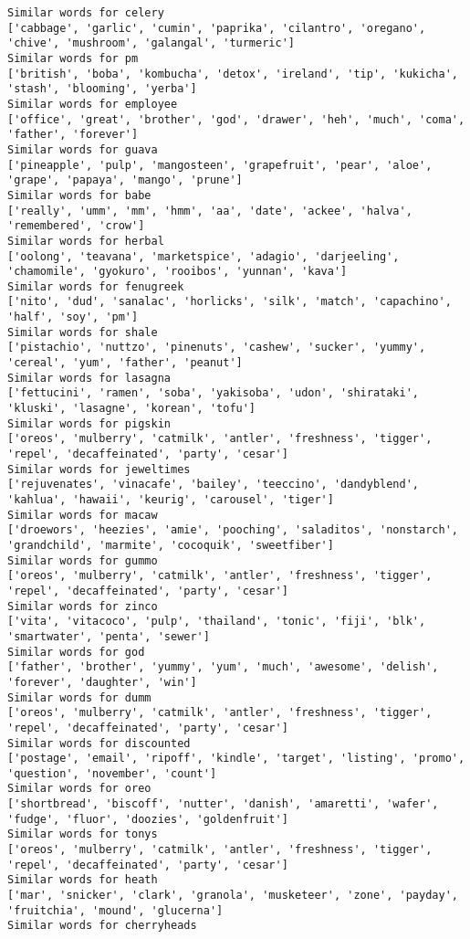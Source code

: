 \documentclass[11pt]{article}
\begin{document}
\begin{Verbatim}[commandchars=\\\{\}]
Similar words for celery
['cabbage', 'garlic', 'cumin', 'paprika', 'cilantro', 'oregano', 'chive', 'mushroom', 'galangal', 'turmeric']
Similar words for pm
['british', 'boba', 'kombucha', 'detox', 'ireland', 'tip', 'kukicha', 'stash', 'blooming', 'yerba']
Similar words for employee
['office', 'great', 'brother', 'god', 'drawer', 'heh', 'much', 'coma', 'father', 'forever']
Similar words for guava
['pineapple', 'pulp', 'mangosteen', 'grapefruit', 'pear', 'aloe', 'grape', 'papaya', 'mango', 'prune']
Similar words for babe
['really', 'umm', 'mm', 'hmm', 'aa', 'date', 'ackee', 'halva', 'remembered', 'crow']
Similar words for herbal
['oolong', 'teavana', 'marketspice', 'adagio', 'darjeeling', 'chamomile', 'gyokuro', 'rooibos', 'yunnan', 'kava']
Similar words for fenugreek
['nito', 'dud', 'sanalac', 'horlicks', 'silk', 'match', 'capachino', 'half', 'soy', 'pm']
Similar words for shale
['pistachio', 'nuttzo', 'pinenuts', 'cashew', 'sucker', 'yummy', 'cereal', 'yum', 'father', 'peanut']
Similar words for lasagna
['fettucini', 'ramen', 'soba', 'yakisoba', 'udon', 'shirataki', 'kluski', 'lasagne', 'korean', 'tofu']
Similar words for pigskin
['oreos', 'mulberry', 'catmilk', 'antler', 'freshness', 'tigger', 'repel', 'decaffeinated', 'party', 'cesar']
Similar words for jeweltimes
['rejuvenates', 'vinacafe', 'bailey', 'teeccino', 'dandyblend', 'kahlua', 'hawaii', 'keurig', 'carousel', 'tiger']
Similar words for macaw
['droewors', 'heezies', 'amie', 'pooching', 'saladitos', 'nonstarch', 'grandchild', 'marmite', 'cocoquik', 'sweetfiber']
Similar words for gummo
['oreos', 'mulberry', 'catmilk', 'antler', 'freshness', 'tigger', 'repel', 'decaffeinated', 'party', 'cesar']
Similar words for zinco
['vita', 'vitacoco', 'pulp', 'thailand', 'tonic', 'fiji', 'blk', 'smartwater', 'penta', 'sewer']
Similar words for god
['father', 'brother', 'yummy', 'yum', 'much', 'awesome', 'delish', 'forever', 'daughter', 'win']
Similar words for dumm
['oreos', 'mulberry', 'catmilk', 'antler', 'freshness', 'tigger', 'repel', 'decaffeinated', 'party', 'cesar']
Similar words for discounted
['postage', 'email', 'ripoff', 'kindle', 'target', 'listing', 'promo', 'question', 'november', 'count']
Similar words for oreo
['shortbread', 'biscoff', 'nutter', 'danish', 'amaretti', 'wafer', 'fudge', 'fluor', 'doozies', 'goldenfruit']
Similar words for tonys
['oreos', 'mulberry', 'catmilk', 'antler', 'freshness', 'tigger', 'repel', 'decaffeinated', 'party', 'cesar']
Similar words for heath
['mar', 'snicker', 'clark', 'granola', 'musketeer', 'zone', 'payday', 'fruitchia', 'mound', 'glucerna']
Similar words for cherryheads

\end{Verbatim}
\end{document}
